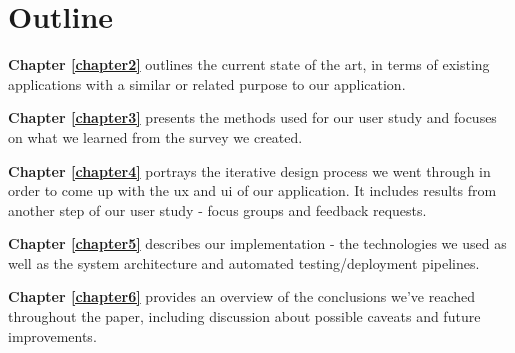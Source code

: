 \section{Outline} \label{1:outline}
    \textbf{Chapter \ref{chapter2}} outlines the current state of the art, in terms of existing applications with a similar or related purpose to our application.
    
    \textbf{Chapter \ref{chapter3}} presents the methods used for our user study and focuses on what we learned from the survey we created.
    
    \textbf{Chapter \ref{chapter4}} portrays the iterative design process we went through in order to come up with the \acrshort{ux} and \acrshort{ui} of our application. It includes results from another step of our user study - focus groups and feedback requests.
    
    \textbf{Chapter \ref{chapter5}} describes our implementation - the technologies we used as well as the system architecture and automated testing/deployment pipelines.
    
    \textbf{Chapter \ref{chapter6}} provides an overview of the conclusions we've reached throughout the paper, including discussion about possible caveats and future improvements.